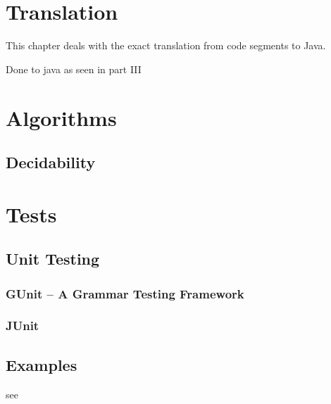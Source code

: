 \section{Translation}
\label{ctr:translation}
This chapter deals with the exact translation from \ooplss code segments
to Java.

Done to java as seen in part III


\section{Algorithms}

\subsection{Decidability}

\section{Tests}
\subsection{Unit Testing}
\subsubsection{GUnit -- A Grammar Testing Framework}
\subsubsection{JUnit}

\subsection{Examples}
see 
